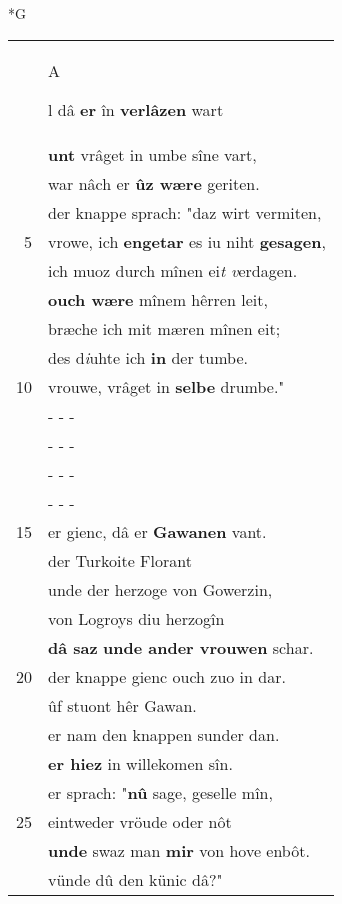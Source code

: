 \documentclass[8pt,a4paper,notitlepage]{article}
\begin{document}
\begin{table}[ht]
\begin{minipage}[t]{0.5\linewidth}
\small
\begin{center}*G
\end{center}
\begin{tabular}{rl}
 & \begin{large}A\end{large}l dâ \textbf{er} în \textbf{verlâzen} wart\\ 
 & \textbf{unt} vrâget in umbe sîne vart,\\ 
 & war nâch er \textbf{ûz wære} geriten.\\ 
 & der knappe sprach: "daz wirt vermiten,\\ 
5 & vrowe, ich \textbf{en}\textbf{getar} es iu niht \textbf{gesagen},\\ 
 & ich muoz durch mînen ei\textit{t v}erdagen.\\ 
 & \textbf{ouch wære} mînem hêrren leit,\\ 
 & bræche ich mit mæren mînen eit;\\ 
 & des d\textit{i}uhte ich \textbf{in} der tumbe.\\ 
10 & vrouwe, vrâget in \textbf{selbe} drumbe."\\ 
 & \multicolumn{1}{l}{ - - - }\\ 
 & \multicolumn{1}{l}{ - - - }\\ 
 & \multicolumn{1}{l}{ - - - }\\ 
 & \multicolumn{1}{l}{ - - - }\\ 
15 & er gienc, dâ er \textbf{Gawanen} vant.\\ 
 & der Turkoite Florant\\ 
 & unde der herzoge von Gowerzin,\\ 
 & von Logroys diu herzogîn\\ 
 & \textbf{dâ saz} \textbf{unde ander vrouwen} schar.\\ 
20 & der knappe gienc ouch zuo in dar.\\ 
 & ûf stuont hêr Gawan.\\ 
 & er nam den knappen sunder dan.\\ 
 & \textbf{er hiez} in willekomen sîn.\\ 
 & er sprach: "\textbf{nû} sage, geselle mîn,\\ 
25 & eintweder vröude oder nôt\\ 
 & \textbf{unde} swaz man \textbf{mir} von hove enbôt.\\ 
 & vünde dû den künic dâ?"\\ 

\end{tabular}
\end{minipage}
\end{table}
\end{document}
